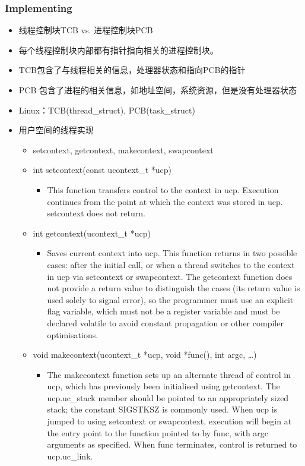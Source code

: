 \documentclass[a4paper, 11pt]{article}
\begin{document}
\subsubsection{Implementing}
\begin{itemize}
  \item{线程控制块TCB vs. 进程控制块PCB}
  \item{每个线程控制块内部都有指针指向相关的进程控制块。}
  \item{TCB包含了与线程相关的信息，处理器状态和指向PCB的指针}
  \item{PCB 包含了进程的相关信息，如地址空间，系统资源，但是没有处理器状态}
  \item{Linux：TCB(thread\_struct), PCB(task\_struct)}
  \item{用户空间的线程实现}
	\begin{itemize}
	  \item{setcontext, getcontext, makecontext, swapcontext}
	  \item{int setcontext(const ucontext\_t *ucp) }
		\begin{itemize}
		  \item{This function transfers control to the context in ucp. Execution
			continues from the point at which the context was stored in ucp.
			setcontext does not return.}
		  \end{itemize}
		
		\item{int getcontext(ucontext\_t *ucp) }
		\begin{itemize}
		  \item{Saves current context into ucp. This function returns in two
			possible cases: after the initial call, or when a thread switches to
			the context in ucp via setcontext or swapcontext. The getcontext
			function does not provide a return value to distinguish the cases
			(its return value is used solely to signal error), so the programmer
			must use an explicit flag variable, which must not be a register
			variable and must be declared volatile to avoid constant propagation
			or other compiler optimisations.}	
		  \end{itemize}

		\item{void makecontext(ucontext\_t *ucp, void *func(), int argc, \dots)}
		\begin{itemize}
		  \item{The makecontext function sets up an alternate thread of control
			in ucp, which has previously been initialised using getcontext. The
			ucp.uc\_stack member should be pointed to an appropriately sized
			stack; the constant SIGSTKSZ is commonly used. When ucp is jumped to
			using setcontext or swapcontext, execution will begin at the entry
			point to the function pointed to by func, with argc arguments as
			specified. When func terminates, control is returned to ucp.uc\_link.}
		  \end{itemize}


\end{itemize}
\end{itemize}
\end{document}
